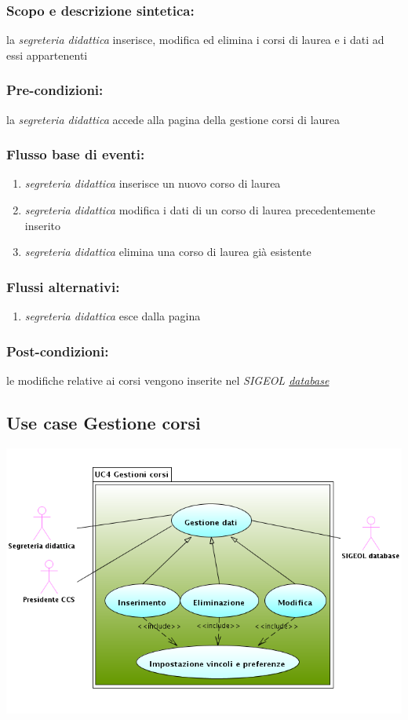 \documentclass[11pt,a4paper]{article}
\begin{document}
\subsubsection*{Scopo e descrizione sintetica:}
la \textit{segreteria didattica} inserisce, modifica ed elimina i corsi di laurea e i dati ad essi appartenenti
\subsubsection*{Pre-condizioni:}
la \textit{segreteria didattica} accede alla pagina della gestione corsi di laurea
\subsubsection*{Flusso base di eventi:}
\begin{enumerate}
 \item \textit{segreteria didattica} inserisce un nuovo corso di laurea
 \item \textit{segreteria didattica} modifica i dati di un corso di laurea precedentemente inserito
 \item \textit{segreteria didattica} elimina una corso di laurea già esistente
\end{enumerate}
\subsubsection*{Flussi alternativi:}
\begin{enumerate} 
\item \textit{segreteria didattica} esce dalla pagina
\end{enumerate}
\subsubsection*{Post-condizioni:}
le modifiche relative ai corsi vengono inserite nel \textit{SIGEOL \underline{database}}

\subsection{Use case Gestione corsi}
\begin{center} 
 \includegraphics[scale=0.5]{images/UseCaseGestioneCorsi.png}
\end{center}
\end{document}
